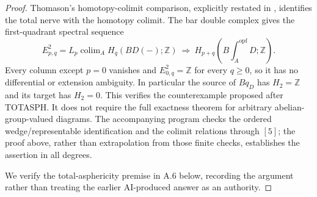 \begin{proof}
Thomason's homotopy-colimit comparison, explicitly restated in
\citet[Section~3.1, equation~(9)]{ACegarra2020}, identifies
the total nerve with the homotopy colimit. The bar double complex
gives the first-quadrant spectral sequence
\[
 E^2_{p,q}=L_p\operatorname{colim}_{A}H_q(BD(-);\mathbb Z)
 \ \Longrightarrow\ H_{p+q}\left(B\int_A^{\mathrm{opf}}D;\mathbb Z\right).
\]
Every column except $p=0$ vanishes and $E^2_{0,q}=\mathbb Z$ for every
$q\geq0$, so it has no differential or extension ambiguity. In
particular the source of $Bq_D$ has $H_2=\mathbb Z$ and its target
has $H_2=0$. This verifies the counterexample proposed after TOTASPH.
It does not require the full exactness theorem for arbitrary
abelian-group-valued diagrams. The accompanying program checks the
ordered wedge/representable identification and the colimit relations
through $[5]$; the proof above, rather than extrapolation from those
finite checks, establishes the assertion in all degrees.

We verify the total-asphericity premise in A.6 below, recording the
argument rather than treating the earlier AI-produced answer as an
authority.
\end{proof}

